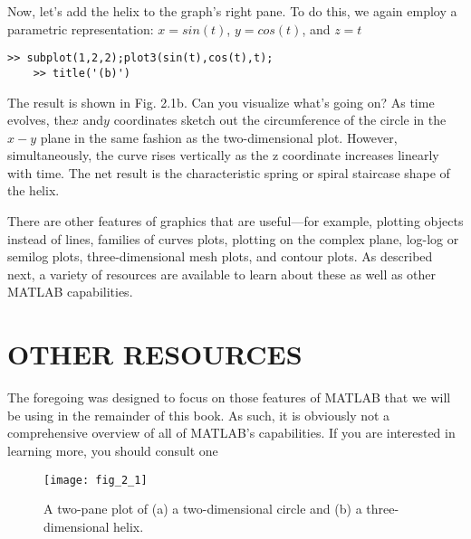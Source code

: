 \documentclass[../main.tex]{subfiles}
\begin{document}
Now, let's add the helix to the graph's right pane. To do this, we again employ a parametric representation:
 $x = sin(t)$, $y = cos(t)$, and $z = t$
 \begin{lstlisting}[frame=none, numbers=none]
	>> subplot(1,2,2);plot3(sin(t),cos(t),t);
	>> title('(b)')
\end{lstlisting}
The result is shown in Fig. 2.1b. Can you visualize what's going on? As time evolves,
the$ x$ and$ y$ coordinates sketch out the circumference of the circle in the $x-y$ plane in the
same fashion as the two-dimensional plot. However, simultaneously, the curve rises vertically as the z coordinate 
increases linearly with time. The net result is the characteristic
spring or spiral staircase shape of the helix.


There are other features of graphics that are useful—for example, plotting objects
instead of lines, families of curves plots, plotting on the complex plane, log-log or semilog
plots, three-dimensional mesh plots, and contour plots. As described next, a variety of resources are available
 to learn about these as well as other MATLAB capabilities.


\section{OTHER RESOURCES}


The foregoing was designed to focus on those features of MATLAB that we will be using
in the remainder of this book. As such, it is obviously not a comprehensive overview of all
of MATLAB's capabilities. If you are interested in learning more, you should consult one


\begin{figure}[H]
	\centering
	\texttt{[image: fig\_2\_1]}
   \caption{\textsf{A two-pane plot of (a) a two-dimensional circle and (b) a three-dimensional helix. }}
   \label{fig_1.}
\end{figure}
\end{document}
